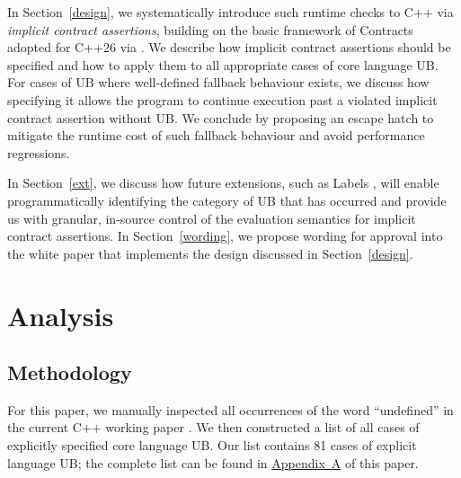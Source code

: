 In Section~\ref{design}, we systematically introduce such runtime checks to C++ via  \emph{implicit contract assertions}, building on the basic framework of Contracts adopted for C++26 via \cite{P2900R14}. We describe how implicit contract assertions should be specified and how to apply them to all appropriate cases of core language UB. For cases of UB where well-defined fallback behaviour exists, we discuss how specifying it allows the program to continue execution past a violated implicit contract assertion without UB. We conclude by proposing an escape hatch to mitigate the runtime cost of such fallback behaviour and avoid performance regressions.

In Section~\ref{ext}, we discuss how future extensions, such as Labels \cite{P3400R1},
will enable programmatically identifying the category of UB that has occurred and provide us with granular, in-source control of the evaluation semantics for implicit contract assertions. In Section~\ref{wording}, we propose wording for approval into the white paper that implements the design discussed in Section~\ref{design}.

\section{Analysis}
\label{ub}



\subsection{Methodology}

For this paper, we manually inspected all occurrences of the word ``undefined'' in the current C++ working paper \cite{N5008}. We then constructed a list of all cases of explicitly specified core language UB. Our list contains 81 cases of explicit language UB; the complete list can be found in \hyperref[appendix]{Appendix~A} of this paper. 

